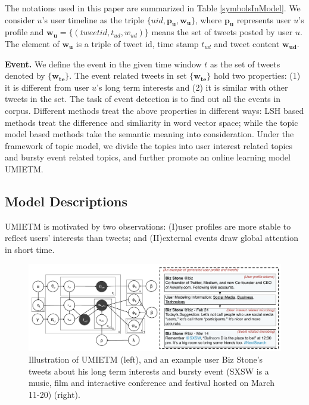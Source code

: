 \documentclass[runningheads,a4paper]{llncs}
\begin{document}
The notations used in this paper are summarized in Table \ref{symbolsInModel}.
We consider \(u\)'s user timeline as  the triple \(\{uid, \bm{p_u},\bm{w_u}\} \), where \(\bm{p_u}\) represents user \(u\)'s profile and \(\bm{w_u}=\{(tweetid, t_{ud},w_{ud})\}\) means the set of tweets posted by user \(u\).
The element of \(\bm{w_u}\) is a triple of tweet id, time stamp \(t_{ud}\) and tweet content \(\bm{w_{ud}}\).



\textbf{Event.} We define the event in the given time window \(t\) as the set of tweets denoted by \( \{ \bm{w_{te}}\}\).
The event related tweets in set \( \{ \bm{w_{te}}\}\)  hold two properties: (1) it is different from user \(u\)'s long term interests and (2) it is similar with other tweets in the set.
The task of event detection is to find out all the events in corpus.
Different methods treat the above properties in different ways: LSH based methods\cite{petrovic2010streaming} treat the difference and simliarity in word vector space; while the topic model based methods\cite{timeUserLDA2012finding} take the semantic meaning into consideration.
Under the framework of topic model, we divide the topics into user interest related topics and bursty event related topics, and further promote an online learning model UMIETM.

\subsection{Model Descriptions}
UMIETM is motivated by two observations: (I)user profiles are more stable to reflect users' interests than tweets; and (II)external events draw global attention in short time.
\begin{figure}
    \includegraphics[width=1.0\textwidth]{img/model.pdf}
    \caption{Illustration of UMIETM (left), and an example user Biz Stone's tweets about his long term interests and  bursty event (SXSW is a music, film and interactive conference and festival hosted on March 11-20) (right).} 
    \label{fig:modelUMIETM}
\end{figure}
\end{document}
